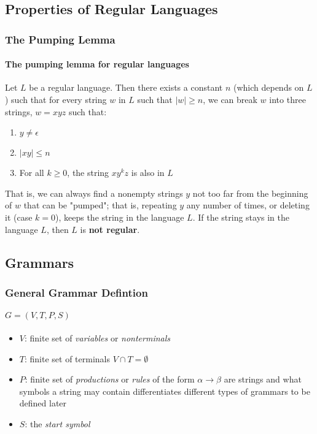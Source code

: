 \documentclass[20pt]{article} %
\begin{document}
\subsection{Properties of Regular Languages}
\subsubsection{The Pumping Lemma}
\paragraph{The pumping lemma for regular languages}  Let $L$ be a regular language. Then there exists a constant $n$ (which depends on $L$) such that for every string $w$ in $L$ such that $|w| \geq n$, we can break $w$ into three strings, $w = xyz$ such that:
\begin{enumerate}
\item $y \neq \epsilon$
\item $|xy| \leq n$
\item For all $k \geq 0$, the string $xy^{k}z$ is also in $L$
\end{enumerate}
That is, we can always find  a nonempty strings $y$ not too far from the beginning of $w$ that can be "pumped"; that is, repeating $y$ any number of times, or deleting it (case $k=0$), keeps the string in the language $L$.  If the string stays in the language $L$, then $L$ is \textbf{not regular}.
\newpage
\subsection{Grammars}
\subsubsection{General Grammar Defintion}
\paragraph{$G = (V, T, P, S)$}
\begin{itemize}
\item $V$: finite set of \textit{variables} or \textit{nonterminals}
\item $T$: finite set of terminals $V \cap T = \emptyset$
\item $P$: finite set of \textit{productions} or \textit{rules} of the form $\alpha \rightarrow \beta$ are strings and what symbols a string may contain differentiates different types of grammars to be defined later
\item $S$: the \textit{start symbol}
\end{itemize}
\end{document}
